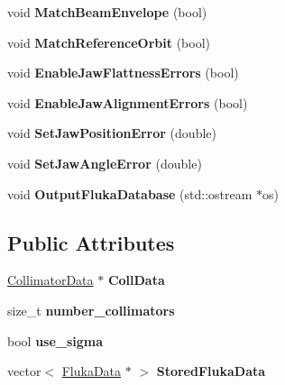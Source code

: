 \begin{DoxyCompactItemize}
void {\bfseries Match\+Beam\+Envelope} (bool)
\item 
\mbox{\label{classCollimatorDatabase_a49489d25f279c54fd72e3825366c8679}} 
void {\bfseries Match\+Reference\+Orbit} (bool)
\item 
\mbox{\label{classCollimatorDatabase_a4f0344dfcf085122ef6d3c86100b9d38}} 
void {\bfseries Enable\+Jaw\+Flattness\+Errors} (bool)
\item 
\mbox{\label{classCollimatorDatabase_aebc1598dbf4c8f17bc492f76c088bd4c}} 
void {\bfseries Enable\+Jaw\+Alignment\+Errors} (bool)
\item 
\mbox{\label{classCollimatorDatabase_a3bef02a7762d782bfb3ed381524f2545}} 
void {\bfseries Set\+Jaw\+Position\+Error} (double)
\item 
\mbox{\label{classCollimatorDatabase_a7b0a6de72a3e3a1ce4b5b707555962fb}} 
void {\bfseries Set\+Jaw\+Angle\+Error} (double)
\item 
\mbox{\label{classCollimatorDatabase_ada524dc893dd45c13589f056d3f88395}} 
void {\bfseries Output\+Fluka\+Database} (std\+::ostream $\ast$os)
\end{DoxyCompactItemize}
\subsection*{Public Attributes}
\begin{DoxyCompactItemize}
\item 
\mbox{\label{classCollimatorDatabase_a9b40299413a16a35cfe70c84bb84b2c6}} 
\hyperlink{structCollimatorDatabase_1_1CollimatorData}{Collimator\+Data} $\ast$ {\bfseries Coll\+Data}
\item 
\mbox{\label{classCollimatorDatabase_af76c72a800ad72332d2b8e419e61cf02}} 
size\+\_\+t {\bfseries number\+\_\+collimators}
\item 
\mbox{\label{classCollimatorDatabase_a365430d78ff5805a7bddae31881a2344}} 
bool {\bfseries use\+\_\+sigma}
\item 
\mbox{\label{classCollimatorDatabase_a11105d827fb57a9f8a6bcbb5516f5851}} 
vector$<$ \hyperlink{structCollimatorDatabase_1_1FlukaData}{Fluka\+Data} $\ast$ $>$ {\bfseries Stored\+Fluka\+Data}
\end{DoxyCompactItemize}
